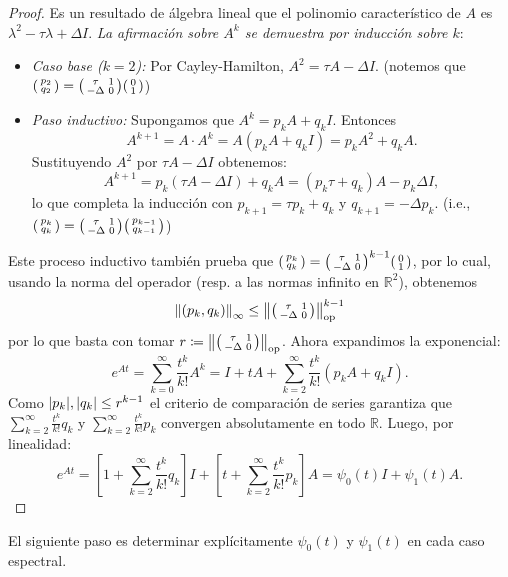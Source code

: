 \begin{proof}
Es un resultado de álgebra lineal que el polinomio característico de $A$ es $\lambda^2 - \tau\lambda + \Delta I$.
\emph{La afirmación sobre $A^k$ se demuestra por inducción sobre $k$}:
\begin{itemize}
\item \emph{Caso base ($k=2$):} Por Cayley-Hamilton, $A^2 = \tau A - \Delta I$. (notemos que $\smqty(p_2\\q_2) = \smqty(\tau&1\\-\Delta&0)\smqty(0\\1)$)

\item \emph{Paso inductivo:} Supongamos que $A^k = p_k A + q_k I$. Entonces
\[
A^{k+1} = A \cdot A^k = A(p_k A + q_k I) = p_k A^2 + q_k A.
\]
Sustituyendo $A^2$ por $\tau A - \Delta I$ obtenemos:
\[
A^{k+1} = p_k (\tau A - \Delta I) + q_k A = (p_k \tau + q_k) A - p_k \Delta I,
\]
lo que completa la inducción con $p_{k+1} = \tau p_k + q_k$ y $q_{k+1} = -\Delta p_k$. (i.e., $\smqty(p_k\\q_k) = \smqty(\tau&1\\-\Delta&0)\smqty(p_{k-1}\\q_{k-1})$)
\end{itemize}
Este proceso inductivo también prueba que $\smqty(p_k\\q_k) = \smqty(\tau&1\\-\Delta&0)^{k-1}\smqty(0\\1)$, por lo cual, usando la norma del operador (resp. a las normas infinito en $\mathbb{R}^2$), obtenemos 
\[
\norm{(p_k,q_k)}_\infty \leq \norm{\smqty(\tau&1\\-\Delta&0)}^{k-1}_{\text{op}}
\]
por lo que basta con tomar $r \coloneq\norm{\smqty(\tau&1\\-\Delta&0)}_{\text{op}}$.
Ahora expandimos la exponencial:
\[
e^{At} = \sum_{k=0}^{\infty} \frac{t^k}{k!} A^k = I + tA + \sum_{k=2}^{\infty} \frac{t^k}{k!} (p_k A + q_k I).
\]
Como $\abs{p_k},\abs{q_k} \leq r^{k-1}$ el criterio de comparación de series garantiza que $\sum_{k=2}^{\infty} \frac{t^k}{k!} q_k$ y $\sum_{k=2}^{\infty} \frac{t^k}{k!} p_k$ convergen absolutamente en todo $\mathbb{R}$. Luego, por linealidad: 
\[
e^{At} = \left[ 1 + \sum_{k=2}^{\infty} \frac{t^k}{k!} q_k \right] I + \left[ t + \sum_{k=2}^{\infty} \frac{t^k}{k!} p_k \right] A = \psi_0(t) I + \psi_1(t) A. 
\]
\end{proof}

\bigskip

El siguiente paso es determinar explícitamente $\psi_0(t)$ y $\psi_1(t)$ en cada caso espectral.

